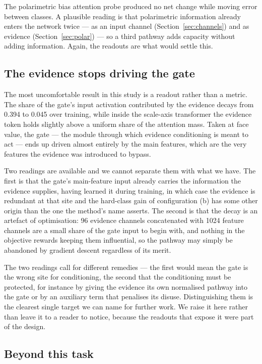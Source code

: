 \documentclass[preprint,12pt,authoryear]{elsarticle}
\begin{document}
The polarimetric bias attention probe produced no net change while moving error
between classes. A plausible reading is that polarimetric information already
enters the network twice --- as an input channel (Section~\ref{sec:channels})
and as evidence (Section~\ref{sec:polar}) --- so a third pathway adds capacity
without adding information. Again, the readouts are what would settle this.

\subsection{The evidence stops driving the gate}

The most uncomfortable result in this study is a readout rather than a metric.
The share of the gate's input activation contributed by the evidence decays from
0.394 to 0.045 over training, while inside the scale-axis transformer the
evidence token holds slightly above a uniform share of the attention mass. Taken
at face value, the gate --- the module through which evidence conditioning is
meant to act --- ends up driven almost entirely by the main features, which are
the very features the evidence was introduced to bypass.

Two readings are available and we cannot separate them with what we have. The
first is that the gate's main-feature input already carries the information the
evidence supplies, having learned it during training, in which case the evidence
is redundant at that site and the hard-class gain of configuration (b) has some
other origin than the one the method's name asserts. The second is that the
decay is an artefact of optimisation: 96 evidence channels concatenated with
1024 feature channels are a small share of the gate input to begin with, and
nothing in the objective rewards keeping them influential, so the pathway may
simply be abandoned by gradient descent regardless of its merit.

The two readings call for different remedies --- the first would mean the gate
is the wrong site for conditioning, the second that the conditioning must be
protected, for instance by giving the evidence its own normalised pathway into
the gate or by an auxiliary term that penalises its disuse. Distinguishing them
is the clearest single target we can name for further work. We raise it here
rather than leave it to a reader to notice, because the readouts that expose it
were part of the design.

\subsection{Beyond this task}
\end{document}
